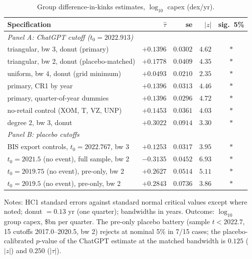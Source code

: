\documentclass[11pt]{article}
\begin{document}
\begin{table}[t]
\centering
\small
\caption{Group difference-in-kinks estimates, $\log_{10}$ capex (dex/yr).}
\label{tab:dik}
\begin{tabular}{lrrrc}
\toprule
Specification & $\hat\tau$ & se & $|z|$ & sig.\ 5\% \\
\midrule
\multicolumn{5}{l}{\emph{Panel A: ChatGPT cutoff ($t_0=2022.913$)}}\\
triangular, bw 3, donut (primary)      & $+0.1396$ & $0.0302$ & $4.62$ & $\ast$ \\
triangular, bw 2, donut (placebo-matched) & $+0.1778$ & $0.0409$ & $4.35$ & $\ast$ \\
uniform, bw 4, donut (grid minimum)    & $+0.0493$ & $0.0210$ & $2.35$ & $\ast$ \\
primary, CR1 by year                   & $+0.1396$ & $0.0313$ & $4.46$ & $\ast$ \\
primary, quarter-of-year dummies       & $+0.1396$ & $0.0296$ & $4.72$ & $\ast$ \\
no-retail control (XOM, T, VZ, UNP)    & $+0.1453$ & $0.0361$ & $4.03$ & $\ast$ \\
degree 2, bw 3, donut                  & $+0.3022$ & $0.0914$ & $3.30$ & $\ast$ \\
\midrule
\multicolumn{5}{l}{\emph{Panel B: placebo cutoffs}}\\
BIS export controls, $t_0=2022.767$, bw 3 & $+0.1253$ & $0.0317$ & $3.95$ & $\ast$ \\
$t_0=2021.5$ (no event), full sample, bw 2 & $-0.3135$ & $0.0452$ & $6.93$ & $\ast$ \\
$t_0=2019.75$ (no event), pre-only, bw 2   & $+0.2627$ & $0.0514$ & $5.11$ & $\ast$ \\
$t_0=2019.5$ (no event), pre-only, bw 2    & $+0.2843$ & $0.0736$ & $3.86$ & $\ast$ \\
\bottomrule
\end{tabular}

\medskip
\parbox{0.92\textwidth}{\footnotesize Notes: HC1 standard errors against
standard normal critical values except where noted; donut $=0.13$ yr (one
quarter); bandwidths in years. Outcome: $\log_{10}$ group capex, \$bn per
quarter. The pre-only placebo battery (sample $t<2022.7$, 15 cutoffs
2017.0--2020.5, bw 2) rejects at nominal 5\% in 7/15 cases; the
placebo-calibrated $p$-value of the ChatGPT estimate at the matched bandwidth
is $0.125$ ($|z|$) and $0.250$ ($|\tau|$).}
\end{table}
\end{document}
